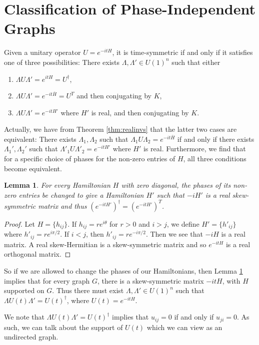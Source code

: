 \documentclass[twocolumn,superscriptaddress]{revtex4-1}
\theoremstyle{plain}
\newtheorem{lemma}[theorem]{Lemma}
\theoremstyle{definition}
\theoremstyle{definition}
\theoremstyle{definition}
\theoremstyle{definition}
\theoremstyle{definition}
\theoremstyle{definition}
\begin{document}
\section{Classification of Phase-Independent Graphs}

Given a unitary operator $U=e^{-itH}$, it is time-symmetric if and only if it satisfies one of three possibilities: There exists $\Lambda,\Lambda'\in U(1)^n$ such that either
\begin{enumerate}
 \item $\Lambda U\Lambda'=e^{itH}=U^\dagger$,
 \item $\Lambda U \Lambda'=e^{-it\overline{H}}=U^T$ and then conjugating by $K$,
 \item $\Lambda U\Lambda'=e^ {-it H'}$ where $H'$ is real, and then conjugating by $K$.
\end{enumerate}
Actually, we have from Theorem \ref{thm:realinvs} that the latter two cases are equivalent: There exists $\Lambda_1,\Lambda_2$ such that $\Lambda_1 U \Lambda_2=e^{-it\overline{H}}$ if and only if there exists $\Lambda_1',\Lambda_2'$ such that $\Lambda'_1 U\Lambda'_2=e^ {-it H'}$ where $H'$ is real. Furthermore, we find that for a specific choice of phases for the non-zero entries of $H$, all three conditions become equivalent.

\begin{lemma}\label{lem:skewsymmetric}
 For every Hamiltonian $H$ with zero diagonal, the phases of its non-zero entries be changed to give a Hamiltonian $H'$ such that $-iH'$ is a real skew-symmetric matrix and thus $(e^{-itH'})^\dagger=(e^{-itH'})^T$.
\end{lemma}
\begin{proof}
 Let $H=\{h_{ij}\}$. If $h_{ij}=re^{i\theta}$ for $r>0$ and $i>j$, we define $H'=\{h'_{ij}\}$ where $h'_{ij}=re^{i\pi/2}$. If $i<j$, then $h'_{ij}=re^{-i\pi/2}$. Then we see that $-iH$ is a real matrix. A real skew-Hermitian is a skew-symmetric matrix and so $e^{-itH}$ is a real orthogonal matrix.
\end{proof}

So if we are allowed to change the phases of our Hamiltonians, then Lemma \ref{lem:skewsymmetric} implies that for every graph $G$, there is a skew-symmetric matrix $-itH$, with $H$ supported on $G$. Thus there must exist $\Lambda,\Lambda'\in U(1)^n$ such that $\Lambda U(t)\Lambda'=U(t)^\dagger$, where $U(t)=e^{-itH}$.

 We note that $\Lambda U(t)\Lambda'=U(t)^\dagger$ implies that $u_{ij}=0$ if and only if $u_{ji}=0$. As such, we can talk about the support of $U(t)$ which we can view as an undirected graph.
\end{document}
